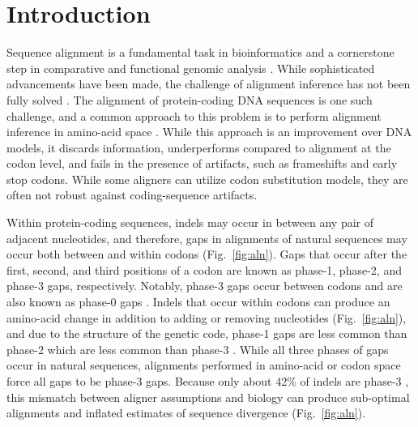 \documentclass[12pt,letterpaper]{article}
\begin{document}

\linenumbers

\section*{Introduction}

Sequence alignment is a fundamental task in bioinformatics and a cornerstone step in comparative and functional genomic analysis \citep{sequence_alignment_rosenberg_2009}. While sophisticated advancements have been made, the challenge of alignment inference has not been fully solved \citep{art_morrison_2015}.
%
The alignment of protein-coding DNA sequences is one such challenge, and a common approach to this problem is to perform alignment inference in amino-acid space \citep[e.g.][]{bininda2005transalign,abascal2010translatorx}. While this approach is an improvement over DNA models, it discards information, underperforms compared to alignment at the codon level, and fails in the presence of artifacts, such as frameshifts and early stop codons. While some aligners can utilize codon substitution models, they are often not robust against coding-sequence artifacts.

Within protein-coding sequences, indels may occur in between any pair of adjacent nucleotides, and therefore, gaps in alignments of natural sequences may occur both between and within codons (Fig.\ \ref{fig:aln}). Gaps that occur after the first, second, and third positions of a codon are known as phase-1, phase-2, and phase-3 gaps, respectively. Notably, phase-3 gaps occur between codons and are also known as phase-0 gaps \citep[e.g.][]{taylor2004occurrence}. Indels that occur within codons can produce an amino-acid change in addition to adding or removing nucleotides (Fig.\ \ref{fig:aln}), and due to the structure of the genetic code, phase-1 gaps are less common than phase-2 which are less common than phase-3 \citep{taylor2004occurrence, zhu2022profiling}. While all three phases of gaps occur in natural sequences, alignments performed in amino-acid or codon space force all gaps to be phase-3 gaps. Because only about 42\% of indels are phase-3 \citep{taylor2004occurrence, zhu2022profiling}, this mismatch between aligner assumptions and biology can produce sub-optimal alignments and inflated estimates of sequence divergence (Fig.\ \ref{fig:aln}).
\end{document}
